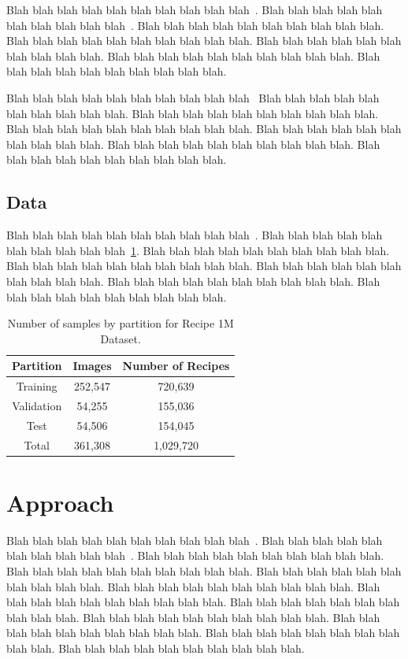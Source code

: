 \documentclass[10pt,twocolumn,letterpaper]{article}
\begin{document}
Blah blah blah blah blah blah blah blah blah blah~\cite{2019fb}. Blah blah blah blah blah blah blah blah blah blah~\cite{vaswani_attention_2017}. Blah blah blah blah blah blah blah blah blah blah. Blah blah blah blah blah blah blah blah blah blah. Blah blah blah blah blah blah blah blah blah blah. Blah blah blah blah blah blah blah blah blah blah. Blah blah blah blah blah blah blah blah blah blah.

Blah blah blah blah blah blah blah blah blah blah~\cite{2019fb} Blah blah blah blah blah blah blah blah blah blah. Blah blah blah blah blah blah blah blah blah blah. Blah blah blah blah blah blah blah blah blah blah. Blah blah blah blah blah blah blah blah blah blah. Blah blah blah blah blah blah blah blah blah blah. Blah blah blah blah blah blah blah blah blah blah.

\subsection{Data}
Blah blah blah blah blah blah blah blah blah blah~\cite{2019fb}. Blah blah blah blah blah blah blah blah blah blah~\ref{table:1}. Blah blah blah blah blah blah blah blah blah blah. Blah blah blah blah blah blah blah blah blah blah. Blah blah blah blah blah blah blah blah blah blah. Blah blah blah blah blah blah blah blah blah blah. Blah blah blah blah blah blah blah blah blah blah.

\begin{table}[h!]
\begin{center}
 \begin{tabular}{c c c} 
 \hline
 Partition & Images & Number of Recipes \\
 \hline
 Training & 252,547 & 720,639 \\ 
 Validation & 54,255 & 155,036 \\
 Test & 54,506 & 154,045 \\
 \hline
 Total & 361,308 & 1,029,720 \\
 \hline
\end{tabular}
\end{center}
\caption{Number of samples by partition for Recipe 1M Dataset.}
\label{table:1}
\end{table}

\section{Approach}
Blah blah blah blah blah blah blah blah blah blah~\cite{2019fb, fb_github}. Blah blah blah blah blah blah blah blah blah blah~\cite{he_deep_2016}. Blah blah blah blah blah blah blah blah blah blah. Blah blah blah blah blah blah blah blah blah blah. Blah blah blah blah blah blah blah blah blah blah. Blah blah blah blah blah blah blah blah blah blah. Blah blah blah blah blah blah blah blah blah blah. Blah blah blah blah blah blah blah blah blah blah. Blah blah blah blah blah blah blah blah blah blah. Blah blah blah blah blah blah blah blah blah blah. Blah blah blah blah blah blah blah blah blah blah. Blah blah blah blah blah blah blah blah blah blah.
\end{document}
